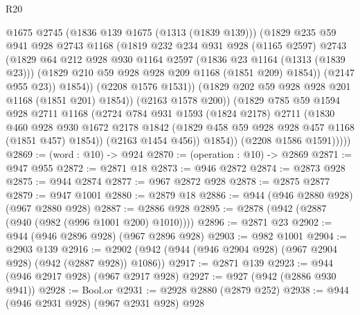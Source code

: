 \begin{lexlean}{R20}
\begin{coremodule}
                      @1675
                      @2745
                      (@1836 @139 @1675 (@1313 (@1839 @139)))
                      (@1829
                        @235
                        @59
                        @941
                        @928
                        @2743
                        @1168
                        (@1819
                          @232
                          @234
                          @931
                          @928
                          (@1165 @2597)
                          @2743
                          (@1829
                            @64
                            @212
                            @928
                            @930
                            @1164
                            @2597
                            (@1836 @23 @1164 (@1313 (@1839 @23)))
                            (@1829 @210 @59 @928 @928 @209 @1168 (@1851 @209) @1854))
                          (@2147 @955 @23))
                        @1854))
                    (@2208 @1576 @1531))
                  (@1829 @202 @59 @928 @928 @201 @1168 (@1851 @201) @1854))
                (@2163 @1578 @200))
              (@1829
                @785
                @59
                @1594
                @928
                @2711
                @1168
                (@2724
                  @784
                  @931
                  @1593
                  (@1824 @2178)
                  @2711
                  (@1830
                    @460
                    @928
                    @930
                    @1672
                    @2178
                    @1842
                    (@1829 @458 @59 @928 @928 @457 @1168 (@1851 @457) @1854))
                  (@2163 @1454 @456))
                @1854))
            (@2208 @1586 @1591)))))
@2869 := (word : @10) -> @924
@2870 := (operation : @10) -> @2869
@2871 := @947 @955
@2872 := @2871 @18
@2873 := @946 @2872
@2874 := @2873 @928
@2875 := @944 @2874
@2877 := @967 @2872 @928
@2878 := @2875 @2877
@2879 := @947 @1001
@2880 := @2879 @18
@2886 := @944 (@946 @2880 @928) (@967 @2880 @928)
@2887 := @2886 @928
@2895 := @2878 (@942 (@2887 (@940 (@982 (@996 @1001 @200) @1010))))
@2896 := @2871 @23
@2902 := @944 (@946 @2896 @928) (@967 @2896 @928)
@2903 := @982 @1001
@2904 := @2903 @139
@2916 := @2902 (@942 (@944 (@946 @2904 @928) (@967 @2904 @928) (@942 (@2887 @928)) @1086))
@2917 := @2871 @139
@2923 := @944 (@946 @2917 @928) (@967 @2917 @928)
@2927 := @927 (@942 (@2886 @930 @941))
@2928 := Bool.or
@2931 := @2928 @2880 (@2879 @252)
@2938 := @944 (@946 @2931 @928) (@967 @2931 @928) @928

\end{coremodule}
\end{lexlean}
